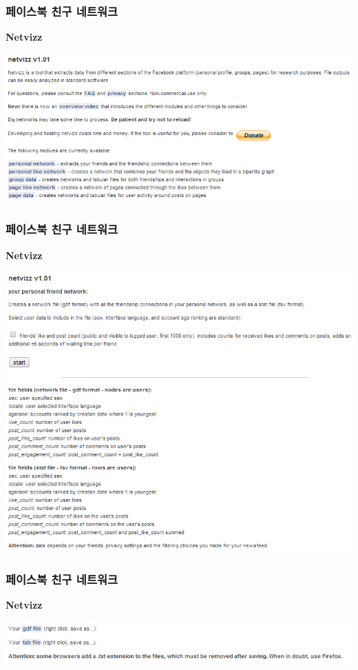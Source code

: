 \documentclass{beamer}
\begin{document}
\begin{frame}
\frametitle{페이스북 친구 네트워크}
\textbf{Netvizz}
\begin{center}
\includegraphics[scale=0.9]{netvizz_2.png}
\end{center}
\end{frame}

\begin{frame}
\frametitle{페이스북 친구 네트워크}
\textbf{Netvizz}
\begin{center}
\includegraphics[scale=0.7]{netvizz_3.png}
\end{center}
\end{frame}

\begin{frame}
\frametitle{페이스북 친구 네트워크}
\textbf{Netvizz}
\begin{center}
\includegraphics[scale=0.7]{netvizz_4.png}
\end{center}
\end{frame}
\end{document}
